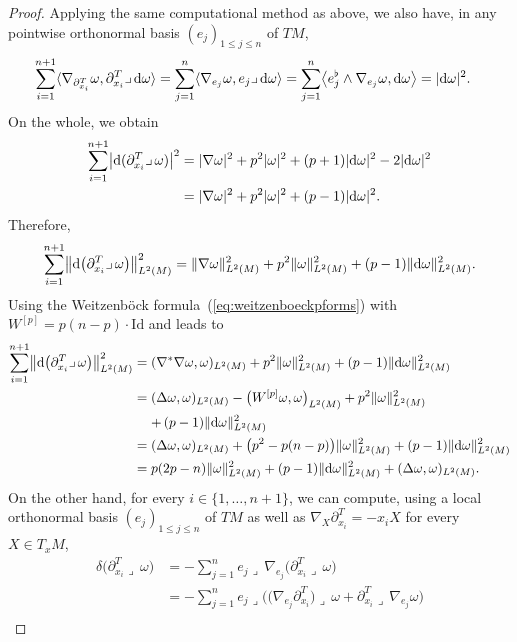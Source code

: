 \documentclass[pdftex]{sigma}
\numberwithin{equation}{section}
\theoremstyle{definition}
\begin{document}
\begin{proof}
Applying the same computational method as above, we also have, in any pointwise or\-tho\-nor\-mal basis $(e_j)_{1\leq j\leq n}$ of $TM$,
\begin{align*}
\sum_{i=1}^{n+1}\langle \nabla_{\partial_{x_i}^T}\omega,\partial_{x_i}^T\lrcorner\,{\rm d}\omega\rangle&=\sum_{j=1}^n\langle \nabla_{e_j}\omega,e_j\lrcorner\,{\rm d}\omega\rangle
=\sum_{j=1}^n\bigl\langle e_j^\flat\wedge\nabla_{e_j}\omega,{\rm d}\omega\bigr\rangle
=|{\rm d}\omega|^2.
\end{align*}
On the whole, we obtain
\begin{align*}
\sum_{i=1}^{n+1}\bigl|{\rm d}(\partial_{x_i}^T\lrcorner\,\omega)\bigr|^2&=|\nabla\omega|^2+p^2|\omega|^2+(p+1)|{\rm d}\omega|^2-2|{\rm d}\omega|^2\\
&=|\nabla\omega|^2+p^2|\omega|^2+(p-1)|{\rm d}\omega|^2.
\end{align*}
Therefore,
\[
\sum_{i=1}^{n+1}\bigl\|{\rm d}\bigl(\partial_{x_i}^T\lrcorner\,\omega\bigr)\bigr\|_{L^2(M)}^2= \|\nabla\omega\|_{L^2(M)}^2+p^2\|\omega\|_{L^2(M)}^2+(p-1)\|{\rm d} \omega\|_{L^2(M)}^2.
\]
Using the Weitzenb\"ock formula~(\ref{eq:weitzenboeckpforms}) with $W^{[p]}=p(n-p)\cdot\mathrm{Id}$ and 
leads to
\begin{align*}
\sum_{i=1}^{n+1}\bigl\|{\rm d}\bigl(\partial_{x_i}^T\lrcorner\,\omega\bigr)\bigr\|_{L^2(M)}^2={}&(\nabla^*\nabla\omega,\omega)_{L^2(M)} +p^2\|\omega\|_{L^2(M)}^2+(p-1)\|{\rm d}\omega\|_{L^2(M)}^2\\
={}&(\Delta\omega,\omega)_{L^2(M)}-\bigl(W^{[p]}\omega,\omega\bigr)_{L^2(M)}+p^2\|\omega\|_{L^2(M)}^2\\
&{}{+}\,(p-1)\|{\rm d}\omega\|_{L^2(M)}^2\\
={}&(\Delta\omega,\omega)_{L^2(M)}+\bigl(p^2-p(n-p)\bigr)\|\omega\|_{L^2(M)}^2+(p-1)\|{\rm d}\omega\|_{L^2(M)}^2\\
={}&p(2p-n)\|\omega\|_{L^2(M)}^2+(p-1)\|{\rm d}\omega\|_{L^2(M)}^2+(\Delta\omega,\omega)_{L^2(M)}.
\end{align*}
On the other hand, for every $i\in\{1,\dots,n+1\}$, we can compute, using a local or\-tho\-nor\-mal basis $(e_j)_{1\leq j\leq n}$ of $TM$ as well as $\nabla_X\partial_{x_i}^T=-x_i X$ for every $X\in T_xM$,
\begin{align*}
\delta\bigl(\partial_{x_i}^T\lrcorner\,\omega\bigr)&=-\sum_{j=1}^ne_j\lrcorner\,\nabla_{e_j}\bigl(\partial_{x_i}^T\lrcorner\,\omega\bigr)\\
&=-\sum_{j=1}^ne_j\lrcorner\bigl(\bigl(\nabla_{e_j}\partial_{x_i}^T\bigr)\lrcorner\,\omega+\partial_{x_i}^T\lrcorner\,\nabla_{e_j}\omega\bigr)\\

\end{align*}
\end{proof}
\end{document}
